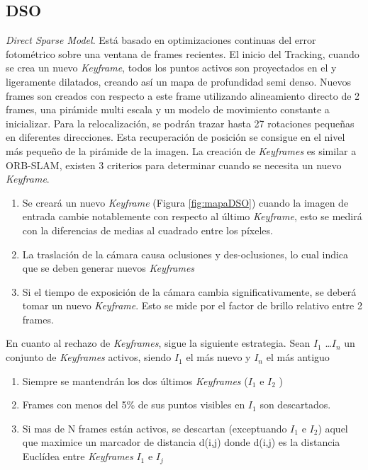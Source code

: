 \subsection{DSO}
\textit{Direct Sparse Model}.
Está basado en optimizaciones continuas del error fotométrico sobre una ventana de frames recientes\cite{Engel2016direct}.
El inicio del Tracking, cuando se crea un nuevo \textit{Keyframe}, todos los puntos activos son proyectados en el y ligeramente dilatados, creando así un mapa de profundidad semi denso. Nuevos frames son creados con respecto a este frame utilizando alineamiento directo de 2 frames, una pirámide multi escala y un modelo de movimiento constante a inicializar. 
Para la relocalización, se podrán trazar hasta 27 rotaciones pequeñas en diferentes direcciones. Esta recuperación de posición se consigue en el nivel más pequeño de la pirámide de la imagen.
La creación de \textit{Keyframes} es similar a ORB-SLAM, existen 3 criterios para determinar cuando se necesita un nuevo \textit{Keyframe}.
\begin {enumerate}
\item Se creará un nuevo \textit{Keyframe} (Figura \ref{fig:mapaDSO}) cuando la imagen de entrada cambie notablemente con respecto al último \textit{Keyframe}, esto se medirá con la diferencias de medias al cuadrado entre los píxeles.
\item La traslación de la cámara causa oclusiones y des-oclusiones, lo cual indica que se deben generar nuevos \textit{Keyframes}
\item Si el tiempo de exposición de la cámara cambia significativamente, se deberá tomar un nuevo \textit{Keyframe}. Esto se mide por el factor de brillo relativo entre 2 frames. 
\end {enumerate}

En cuanto al rechazo de \textit{Keyframes}, sigue la siguiente estrategia. Sean $I_1$ \dots $I_n$ un conjunto de \textit{Keyframes} activos, siendo $I_1$ el más nuevo y $I_n$ el más antiguo
\begin {enumerate}
\item Siempre se mantendrán los dos últimos \textit{Keyframes} ($I_1$  e $I_2$ )
\item Frames con menos del 5\% de sus puntos visibles en $I_1$  son descartados.
\item Si mas de N frames están activos, se descartan (exceptuando $I_1$  e $I_2$) aquel que maximice un marcador de distancia d(i,j) donde d(i,j) es la distancia Euclídea entre \textit{Keyframes} $I_1$  e $I_j$
\end {enumerate}

